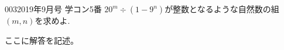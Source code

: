 \begin{prob}{003}{}{2019年9月号 学コン5番}
 $20^m\div (1-9^n)$が整数となるような自然数の組$(m,n)$を求めよ.
\end{prob}

ここに解答を記述。
